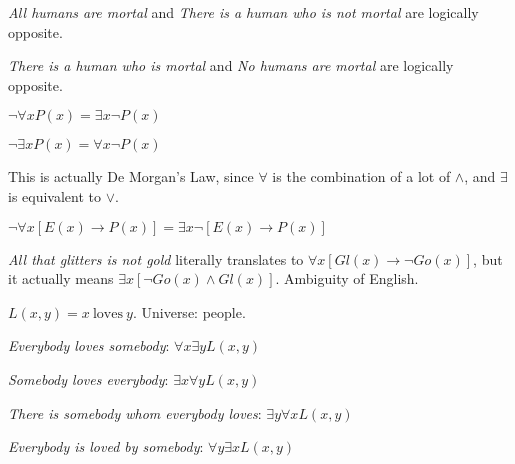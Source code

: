 \begin{ex}

\textit{All humans are mortal} and \textit{There is a human who is not mortal} are logically opposite.

\textit{There is a human who is mortal} and \textit{No humans are mortal} are logically opposite.

\end{ex}

$\lnot \forall x P(x) = \exists x \lnot P(x)$

$\lnot \exists x P(x) = \forall x \lnot P(x)$

\begin{remark}

This is actually De Morgan's Law, since $\forall$ is the combination of a lot of $\land$, and $\exists$ is equivalent to $\lor$.

\end{remark}

\begin{ex}

$\lnot \forall x [ E(x) \rightarrow P(x) ] = \exists x \lnot [ E(x) \rightarrow P(x) ]$

\end{ex}

\begin{ex}

\textit{All that glitters is not gold} literally translates to $\forall x [ {Gl}(x) \rightarrow \lnot {Go}(x) ]$, but it actually means $\exists x [ \lnot {Go}(x) \land {Gl}(x) ]$. Ambiguity of English.

\end{ex}

\begin{ex}

$L(x, y) = x\ \mathrm{loves}\ y$. Universe: people.

\textit{Everybody loves somebody}: $\forall x \exists y L(x, y)$

\textit{Somebody loves everybody}: $\exists x \forall y L(x, y)$

\textit{There is somebody whom everybody loves}: $\exists y \forall x L(x, y)$

\textit{Everybody is loved by somebody}: $\forall y \exists x L(x, y)$

\end{ex}

